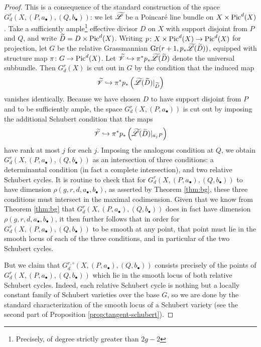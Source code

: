 \documentclass{amsart}
\begin{document}
\begin{proof} This is a consequence of the standard construction of
the space $G^r_d(X,(P,a_{\bullet}),(Q,b_{\bullet}))$: we let 
$\widetilde{{\mathscr L}}$ be a Poincar\'e line bundle on $X \times \operatorname{Pic}^d(X)$.
Take a sufficiently ample\footnote{Precisely, of degree strictly greater
than $2g-2$} effective divisor $D$ on $X$ with support
disjoint from $P$ and $Q$, and write $\widetilde{D}=D \times \operatorname{Pic}^d(X)$. Writing $p\colon X\times \operatorname{Pic}^d(X)\to\operatorname{Pic}^d(X)$ for projection, let
$G$ be the relative Grassmannian 
$\operatorname{Gr}(r+1,p_{*} \widetilde{{\mathscr L}}(\widetilde{D}))$, equipped with structure map $\pi\colon G\to \operatorname{Pic}^d(X)$.  Let $\widetilde{{\mathscr V}} \hookrightarrow \pi^* p_{*} \widetilde{{\mathscr L}}(\widetilde{D})$ denote the universal subbundle.
Then $G^r_d(X)$ is cut out in $G$ by the condition that the induced map
$$\widetilde{{\mathscr V}} \hookrightarrow \pi^*p_{*}\left( \widetilde{{\mathscr L}}(\widetilde{D})|_{\widetilde{D}}\right)$$
vanishes identically. Because we have chosen $D$ to have support disjoint  
from $P$ and to be sufficiently ample, the space 
$G^r_d(X,(P,a_{\bullet}))$ is cut out by imposing the
additional Schubert condition that the maps
$$\widetilde{{\mathscr V}} \hookrightarrow \pi^* p_{*}\left( \widetilde{{\mathscr L}}(\widetilde{D})|_{a_j P}\right)$$
have rank at most $j$ for each $j$. 
Imposing the analogous condition at 
$Q$, we obtain $G^r_d(X,(P,a_{\bullet}),(Q,b_{\bullet}))$ as an 
intersection of three conditions: a determinantal condition (in fact a
complete intersection), and two relative Schubert cycles. It is routine
to check that for
$G^r_d(X,(P,a_{\bullet}),(Q,b_{\bullet}))$ to have dimension
$\rho(g,r,d,a_{\bullet},b_{\bullet})$, as asserted by Theorem \ref{thm:bg}, 
these three
conditions must intersect in the maximal codimension. Given that we know
from Theorem \ref{thm:bg} that
$G^r_d(X,(P,a_{\bullet}),(Q,b_{\bullet}))$ does in fact have dimension
$\rho(g,r,d,a_{\bullet},b_{\bullet})$, it then further
follows that in order for
$G^r_d(X,(P,a_{\bullet}),(Q,b_{\bullet}))$ to be smooth at any point,
that point must lie in the smooth locus of each of the three conditions,
and in particular of the two Schubert cycles. 

But we claim that
$G^{r,\circ}_d(X,(P,a_{\bullet}),(Q,b_{\bullet}))$ consists precisely of the
points of $G^r_d(X,(P,a_{\bullet}),(Q,b_{\bullet}))$ which lie in the 
smooth locus of both relative Schubert cycles. 
Indeed, each relative Schubert cycle is nothing but a locally constant family of Schubert varieties over the base $G$, so we are done by the standard characterization of the smooth locus of a Schubert variety (see the second part of Proposition \ref{prop:tangent-schubert}). 
\end{proof}
\end{document}
